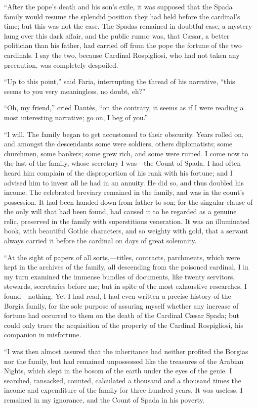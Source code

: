 “After the pope’s death and his son’s exile, it was supposed that the
Spada family would resume the splendid position they had held before
the cardinal’s time; but this was not the case. The Spadas remained in
doubtful ease, a mystery hung over this dark affair, and the public
rumor was, that Cæsar, a better politician than his father, had carried
off from the pope the fortune of the two cardinals. I say the two,
because Cardinal Rospigliosi, who had not taken any precaution, was
completely despoiled.

“Up to this point,” said Faria, interrupting the thread of his
narrative, “this seems to you very meaningless, no doubt, eh?”

“Oh, my friend,” cried Dantès, “on the contrary, it seems as if I were
reading a most interesting narrative; go on, I beg of you.”

“I will. The family began to get accustomed to their obscurity. Years
rolled on, and amongst the descendants some were soldiers, others
diplomatists; some churchmen, some bankers; some grew rich, and some
were ruined. I come now to the last of the family, whose secretary I
was—the Count of Spada. I had often heard him complain of the
disproportion of his rank with his fortune; and I advised him to invest
all he had in an annuity. He did so, and thus doubled his income. The
celebrated breviary remained in the family, and was in the count’s
possession. It had been handed down from father to son; for the
singular clause of the only will that had been found, had caused it to
be regarded as a genuine relic, preserved in the family with
superstitious veneration. It was an illuminated book, with beautiful
Gothic characters, and so weighty with gold, that a servant always
carried it before the cardinal on days of great solemnity.

“At the sight of papers of all sorts,—titles, contracts, parchments,
which were kept in the archives of the family, all descending from the
poisoned cardinal, I in my turn examined the immense bundles of
documents, like twenty servitors, stewards, secretaries before me; but
in spite of the most exhaustive researches, I found—nothing. Yet I had
read, I had even written a precise history of the Borgia family, for
the sole purpose of assuring myself whether any increase of fortune had
occurred to them on the death of the Cardinal Cæsar Spada; but could
only trace the acquisition of the property of the Cardinal Rospigliosi,
his companion in misfortune.

“I was then almost assured that the inheritance had neither profited
the Borgias nor the family, but had remained unpossessed like the
treasures of the Arabian Nights, which slept in the bosom of the earth
under the eyes of the genie. I searched, ransacked, counted, calculated
a thousand and a thousand times the income and expenditure of the
family for three hundred years. It was useless. I remained in my
ignorance, and the Count of Spada in his poverty.

